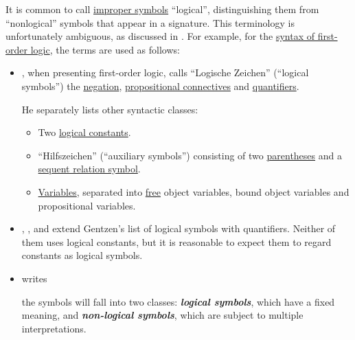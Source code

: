 \begin{remark}\label{rem:logical_symbol_terminology}
  It is common to call \hyperref[con:improper_symbol]{improper symbols} \enquote{logical}, distinguishing them from \enquote{nonlogical} symbols that appear in a signature. This terminology is unfortunately ambiguous, as discussed in \cite{MathSE:are_variables_logical_symbols}. For example, for the \hyperref[def:first_order_syntax]{syntax of first-order logic}, the terms are used as follows:
  \begin{itemize}
    \item {}, when presenting first-order logic, calls \enquote{Logische Zeichen} (\enquote{logical symbols}) the \hyperref[def:propositional_alphabet/negation]{negation}, \hyperref[def:propositional_alphabet/connectives]{propositional connectives} and \hyperref[def:predicate_logic_alphabet/quantifiers]{quantifiers}.

    He separately lists other syntactic classes:
    \begin{itemize}
      \item Two \hyperref[def:propositional_alphabet/constants]{logical constants}.
      \item \enquote{Hilfszeichen} (\enquote{auxiliary symbols}) consisting of two \hyperref[def:propositional_alphabet/parentheses]{parentheses} and a \hyperref[def:sequent]{sequent relation symbol}.
      \item \hyperref[con:variable]{Variables}, separated into \hyperref[con:variable_binding]{free} object variables, bound object variables and propositional variables.
    \end{itemize}

    \item {}, ,  and  extend Gentzen's list of logical symbols with quantifiers. Neither of them uses logical constants, but it is reasonable to expect them to regard constants as logical symbols.

    \item {} writes
    \begin{displayquote}
      \textellipsis the symbols will fall into two classes: \textit{\textbf{logical symbols}}, which have a fixed meaning, and \textit{\textbf{non-logical symbols}}, which are subject to multiple interpretations.
    \end{displayquote}


\end{itemize}
\end{remark}
